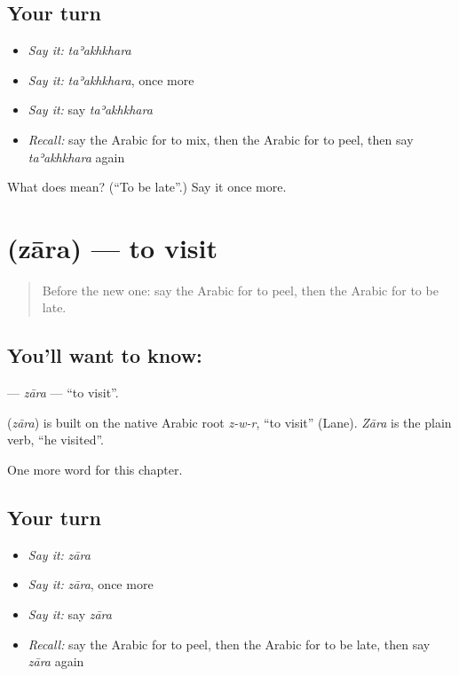 \subsection*{Your turn}
\begin{itemize}
\raggedright
  \item \emph{Say it:} \emph{taʾakhkhara}
  \item \emph{Say it:} \emph{taʾakhkhara}, once more
  \item \emph{Say it:} say \emph{taʾakhkhara}
  \item \emph{Recall:} say the Arabic for to mix, then the Arabic for to peel, then say \emph{taʾakhkhara} again
\end{itemize}

\begin{tcolorbox}[breakable,colback=teal!4,colframe=teal!35!black,title={Before you move on}]
What does  mean? (\textquotedblleft{}To be late\textquotedblright{}.) Say it once more.
\end{tcolorbox}
\section[\texorpdfstring{\ar{زار} (zāra)}{زار (zāra)}]{ (zāra) — to visit}

\label{lesson:AR-C255-zara}



\begin{quote}
Before the new one: say the Arabic for to peel, then the Arabic for to be late.
\end{quote}

\subsection*{You'll want to know: }
\textbf{} — \emph{zāra} — \textquotedblleft{}to visit\textquotedblright{}.

\begin{cousinweb}
\textbf{} (\emph{zāra}) is built on the native Arabic root \emph{z-w-r}, \textquotedblleft{}to visit\textquotedblright{} (Lane). \emph{Zāra} is the plain verb, \textquotedblleft{}he visited\textquotedblright{}.
\end{cousinweb}

\begin{grammarlens}[title={What you've built}]
One more word for this chapter.
\end{grammarlens}

\subsection*{Your turn}
\begin{itemize}
\raggedright
  \item \emph{Say it:} \emph{zāra}
  \item \emph{Say it:} \emph{zāra}, once more
  \item \emph{Say it:} say \emph{zāra}
  \item \emph{Recall:} say the Arabic for to peel, then the Arabic for to be late, then say \emph{zāra} again
\end{itemize}

